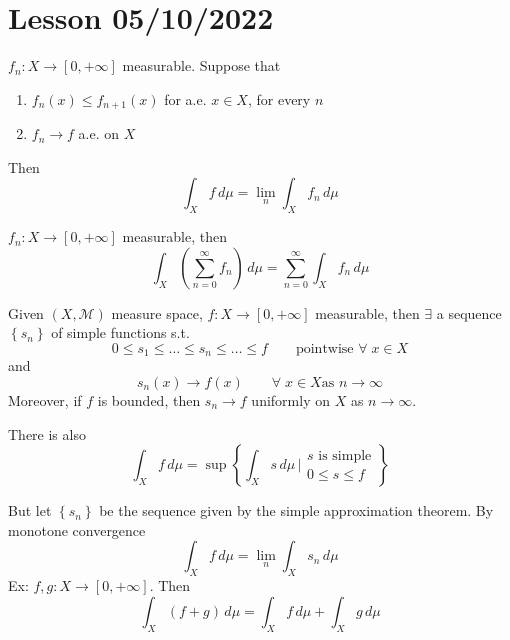 \section{Lesson 05/10/2022}
\begin{theorem}
    \(f_n : X \to [0, +\infty]\) measurable. Suppose that 
    \begin{enumerate}
        \item \(f_n(x) \leq f_{n+1}(x)\) for a.e. \(x \in X\), for every \(n\)
        \item \(f_n \to f\) a.e. on \(X\) 
    \end{enumerate}
    Then 
    \[
        \int_X f \, d\mu = \lim_n \int_X f_n \, d\mu
    \]
\end{theorem}

\begin{corollary}
    \(f_n : X \to [0, +\infty]\) measurable, then 
    \[
        \int_X \left( \sum_{n=0}^{\infty} f_n\right) \, d\mu = \sum_{n=0}^{\infty} \int_X f_n \, d\mu
    \]
\end{corollary}

\begin{theorem}
    Given \((X, \mathcal{M})\) measure space, \(f: X \to [0, +\infty]\) measurable, then \(\exists\) a sequence \(\left\{ s_n \right\}\) of simple functions s.t. 
    \[
        0 \leq s_1 \leq \ldots \leq s_n \leq \ldots \leq f \qquad \text{pointwise } \forall \; x \in X
    \]
    and 
    \[
        s_n (x) \to f(x) \qquad \forall \; x \in X \text{as } n \to \infty 
    \]
    Moreover, if \(f\) is bounded, then \(s_n \to f\) uniformly on \(X\) as \(n \to \infty\).
\end{theorem}

\begin{remark}
    There is also
    \[
        \int_X f \, d\mu = \sup \left\{ \int_X s \, d\mu \, \bigg\vert \begin{array}{l}s\text{ is simple} \\ 0 \leq s \leq f \end{array}\right\}
    \]
\end{remark}

But let \(\left\{ s_n \right\}\) be the sequence given by the simple approximation theorem. By monotone convergence 
\[
    \int_X f \, d\mu = \lim_n \int_X s_n \, d\mu
\]
Ex: \(f, g : X \to [0, +\infty]\). Then 
\[
    \int_X (f+g) \, d\mu = \int_X f \, d\mu + \int_X g \, d\mu
\]

